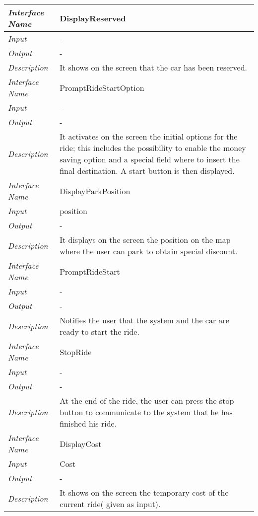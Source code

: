 \documentclass[11pt,a4paper]{report}
\begin{document}
	\begin{tabularx}{\textwidth}{|>{\em}l|X|}
		\hline
		Interface Name& DisplayReserved\\
		\hline
		Input & -\\
		\hline
		Output & -\\
		\hline
		Description & It shows on the screen that the car has been reserved.\\
		\hline
		\hline
		Interface Name& PromptRideStartOption\\
		\hline
		Input & -\\
		\hline
		Output & -\\
		\hline
		Description &It activates on the screen the initial options for the ride; this includes the possibility to enable the money saving option and a special field where to insert the final destination. A start button is then displayed.\\
		\hline
		\hline
		Interface Name& DisplayParkPosition\\
		\hline
		Input & position\\
		\hline
		Output & -\\
		\hline
		Description &It displays on the screen the position on the map where the user can park to obtain special discount.\\
		\hline
		\hline
		Interface Name& PromptRideStart\\
		\hline
		Input & -\\
		\hline
		Output & -\\
		\hline
		Description &Notifies the user that the system and the car are ready to start the ride.\\
		\hline
		\hline
		Interface Name& StopRide\\
		\hline
		Input & -\\
		\hline
		Output & -\\
		\hline
		Description &At the end of the ride, the user can press the stop button to communicate to the system that he has finished his ride.\\
		\hline
		\hline
		Interface Name& DisplayCost\\
		\hline
		Input & Cost\\
		\hline
		Output & -\\
		\hline
		Description &It shows on the screen the temporary cost of the current ride( given as input). \\
		\hline
	\end{tabularx}
\end{document}
